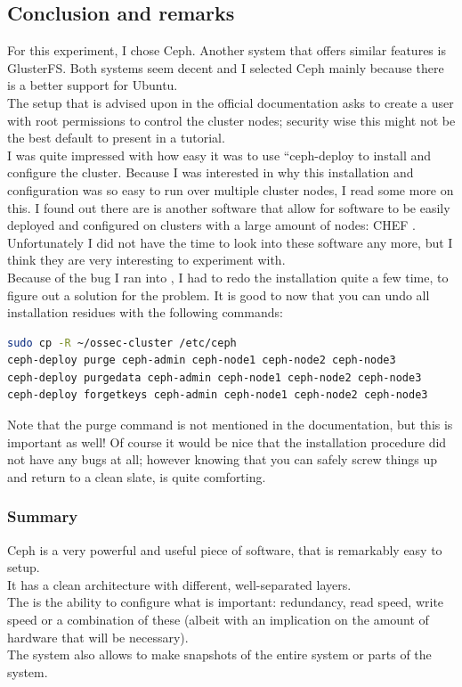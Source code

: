 \documentclass[12pt]{report}
\begin{document}
\subsection{Conclusion and remarks}
For this experiment, I chose Ceph. Another system that offers similar
features is GlusterFS. Both systems seem decent and I selected Ceph
mainly because there is a better support for Ubuntu.\\
The setup that is advised upon in the official documentation asks to
create a user with root permissions to control the cluster nodes;
security wise this might not be the best default to present in a tutorial.\\
I was quite impressed with how easy it was to use ``ceph-deploy
to install and configure the cluster. Because I was interested in why
this installation and configuration was so easy to run over multiple
cluster nodes, I read some more on this. I found out there are
is another software that allow for software to be easily deployed and
configured on clusters with a large amount of nodes: CHEF
\cite{chef_soft}. Unfortunately I
did not have the time to look into these software any more, but I
think they are very interesting to experiment with.\\
Because of the bug I ran into \cite{ceph_bug_1}, I had to redo the
installation quite a few time, to figure out a solution for the
problem.
It is good to now that you can undo all installation residues with the
following commands:
\begin{lstlisting}[language=bash]
sudo cp -R ~/ossec-cluster /etc/ceph
ceph-deploy purge ceph-admin ceph-node1 ceph-node2 ceph-node3
ceph-deploy purgedata ceph-admin ceph-node1 ceph-node2 ceph-node3
ceph-deploy forgetkeys ceph-admin ceph-node1 ceph-node2 ceph-node3
\end{lstlisting}
Note that the purge command is not mentioned in the documentation, but
this is important as well!
Of course it would be nice that the installation procedure did not have any bugs
at all; however knowing that you can safely screw things up and return to a
clean slate, is quite comforting.\\
\subsubsection{Summary}
Ceph is a very powerful and useful piece of software, that is
remarkably easy to setup.\\
It has a clean architecture with different, well-separated layers.\\
The is the ability to configure what is important: redundancy, read
speed, write speed or a combination of these (albeit with an
implication on the amount of hardware that will be necessary).\\
The system also allows to make snapshots of the entire system or parts
of the system.
\end{document}

